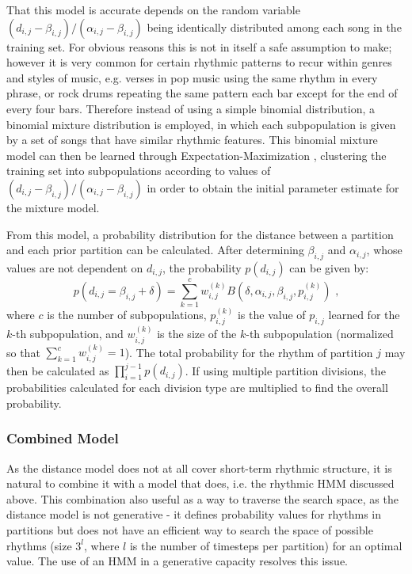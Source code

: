 \documentclass[ author={Stephen Livermore-Tozer},
				supervisor={Dr. Peter Flach},
				degree={MEng},
				title={Algorithmic Co-composition Using Machine Learning},
				subtitle={},
				type={research},
				year={2016} ]{dissertation}
\begin{document}
	That this model is accurate depends on the random variable $(d_{i,j}-\beta_{i,j})/(\alpha_{i,j}-\beta_{i,j})$ being identically distributed among each song in the training set. For obvious reasons this is not in itself a safe assumption to make; however it is very common for certain rhythmic patterns to recur within genres and styles of music, e.g. verses in pop music using the same rhythm in every phrase, or rock drums repeating the same pattern each bar except for the end of every four bars. Therefore instead of using a simple binomial distribution, a binomial mixture distribution is employed, in which each subpopulation is given by a set of songs that have similar rhythmic features. This binomial mixture model can then be learned through Expectation-Maximization \cite{bilmes1998gentle}, clustering the training set into subpopulations according to values of $(d_{i,j}-\beta_{i,j})/(\alpha_{i,j}-\beta_{i,j})$ in order to obtain the initial parameter estimate for the mixture model.
	
	From this model, a probability distribution for the distance between a partition and each prior partition can be calculated. After determining $\beta_{i,j}$ and $\alpha_{i,j}$, whose values are not dependent on $d_{i,j}$, the probability $p(d_{i,j})$ can be given by:
	$$p(d_{i,j} = \beta_{i,j} + \delta) = \sum_{k=1}^{c} w_{i,j}^{(k)} B(\delta,\alpha_{i,j},\beta_{i,j},p_{i,j}^{(k)}) \text{ ,}$$
	where $c$ is the number of subpopulations, $p_{i,j}^{(k)}$ is the value of $p_{i,j}$ learned for the $k$-th subpopulation, and $w_{i,j}^{(k)}$ is the size of the $k$-th subpopulation (normalized so that $\sum_{k=1}^{c} w_{i,j}^{(k)} = 1$). The total probability for the rhythm of partition $j$ may then be calculated as $\prod_{i=1}^{j-1} p(d_{i,j})$. If using multiple partition divisions, the probabilities calculated for each division type are multiplied to find the overall probability. 
	
	\subsubsection{Combined Model}
	
	As the distance model does not at all cover short-term rhythmic structure, it is natural to combine it with a model that does, i.e. the rhythmic HMM discussed above. This combination also useful as a way to traverse the search space, as the distance model is not generative - it defines probability values for rhythms in partitions but does not have an efficient way to search the space of possible rhythms (size $3^l$, where $l$ is the number of timesteps per partition) for an optimal value. The use of an HMM in a generative capacity resolves this issue.
	
\end{document}

